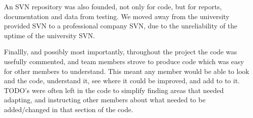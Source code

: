 An SVN repository was also founded, not only for code, but for reports, documentation and data from testing. We moved away from the university provided SVN to a professional company SVN, due to the unreliability of the uptime of the university SVN.\linebreak 

Finallly, and possibly most importantly, throughout the project the code was usefully commented, and team members strove to produce code which was easy for other members to understand. This meant any member would be able to look and the code, understand it, see where it could be improved, and add to to it. TODO's were often left in the code to simplify finding areas that needed adapting, and instructing other members about what needed to be added/changed in that section of the code.
